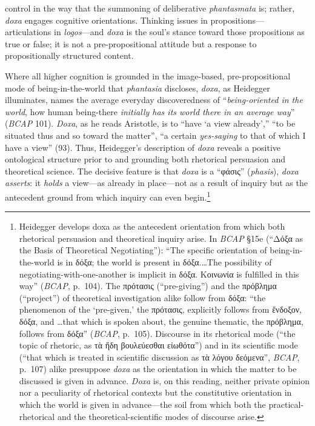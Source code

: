 \documentclass{article}
\newcommand{\gk}[1]{{\greekfont #1}}
\begin{document}
control in the way that the summoning of deliberative \textit{phantasmata} is; rather, \textit{doxa} engages cognitive orientations. Thinking issues in propositions---articulations in \textit{logos}---and \textit{doxa} is the soul's stance toward those propositions as true or false; it is not a pre-propositional attitude but a response to propositionally structured content.

Where all higher cognition is grounded in the image-based, pre-propositional mode of being-in-the-world that \textit{phantasia} discloses, \textit{doxa}, as Heidegger illuminates, names the average everyday discoveredness of ``\textit{being-oriented in the world}, how human being-there \textit{initially has its world there in an average way}'' (\textit{BCAP} 101). \textit{Doxa}, as he reads Aristotle, is to ``have `a view already','' ``to be situated thus and so toward the matter'', ``a certain \textit{yes-saying} to that of which I have a view'' (93). Thus, Heidegger's description of \textit{doxa} reveals a positive ontological structure prior to and grounding both rhetorical persuasion and theoretical science. The decisive feature is that \textit{doxa} is a ``\gk{φάσις}'' (\textit{phasis}), \textit{doxa asserts}: it \textit{holds} a view---as already in place---not as a result of inquiry but as the antecedent ground from which inquiry can even begin.\footnote{Heidegger develops doxa as the antecedent orientation from which both rhetorical persuasion and theoretical inquiry arise. In \textit{BCAP} §15e (``\gk{Δόξα} as the Basis of Theoretical Negotiating''): ``The specific orientation of being-in-the-world is in \gk{δόξα}; the world is present in \gk{δόξα}.\dots The possibility of negotiating-with-one-another is implicit in \gk{δόξα}. \gk{Κοινωνία} is fulfilled in this way'' (\textit{BCAP}, p.~104). The \gk{πρότασις} (``pre-giving'') and the \gk{πρόβλημα} (``project'') of theoretical investigation alike follow from \gk{δόξα}: ``the phenomenon of the `pre-given,' the \gk{πρότασις}, explicitly follows from \gk{ἔνδοξον}, \gk{δόξα}, and \dots that which is spoken about, the genuine thematic, the \gk{πρόβλημα}, follows from \gk{δόξα}'' (\textit{BCAP}, p.~105). Discourse in its rhetorical mode (``the topic of rhetoric, as \gk{τὰ ἤδη βουλεύεσθαι εἰωθότα}'') and in its scientific mode (``that which is treated in scientific discussion as \gk{τὰ λόγου δεόμενα}'', \textit{BCAP}, p.~107) alike presuppose \textit{doxa} as the orientation in which the matter to be discussed is given in advance. \textit{Doxa} is, on this reading, neither private opinion nor a peculiarity of rhetorical contexts but the constitutive orientation in which the world is given in advance---the soil from which both the practical-rhetorical and the theoretical-scientific modes of discourse arise.}
\end{document}
